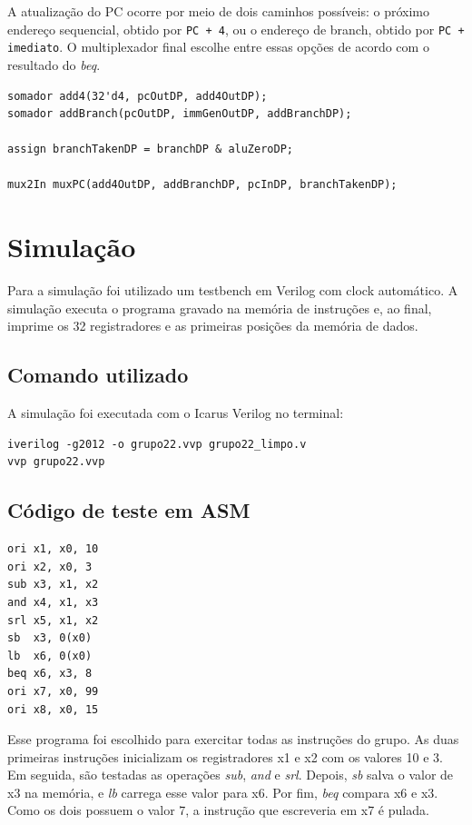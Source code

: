 \documentclass[12pt,a4paper]{article}
\begin{document}
A atualização do PC ocorre por meio de dois caminhos possíveis: o próximo endereço sequencial, obtido por \texttt{PC + 4}, ou o endereço de branch, obtido por \texttt{PC + imediato}. O multiplexador final escolhe entre essas opções de acordo com o resultado do \textit{beq}.

\begin{lstlisting}[style=verilogstyle,caption={Atualização do PC e decisão de branch.}]
somador add4(32'd4, pcOutDP, add4OutDP);
somador addBranch(pcOutDP, immGenOutDP, addBranchDP);

assign branchTakenDP = branchDP & aluZeroDP;

mux2In muxPC(add4OutDP, addBranchDP, pcInDP, branchTakenDP);
\end{lstlisting}

\section{Simulação}

Para a simulação foi utilizado um testbench em Verilog com clock automático. A simulação executa o programa gravado na memória de instruções e, ao final, imprime os 32 registradores e as primeiras posições da memória de dados.

\subsection{Comando utilizado}

A simulação foi executada com o Icarus Verilog no terminal:

\begin{lstlisting}[style=textstyle,caption={Comando utilizado para compilar e executar a simulação.}]
iverilog -g2012 -o grupo22.vvp grupo22_limpo.v
vvp grupo22.vvp
\end{lstlisting}

\subsection{Código de teste em ASM}

\begin{lstlisting}[style=textstyle,caption={Programa de teste em Assembly.}]
ori x1, x0, 10
ori x2, x0, 3
sub x3, x1, x2
and x4, x1, x3
srl x5, x1, x2
sb  x3, 0(x0)
lb  x6, 0(x0)
beq x6, x3, 8
ori x7, x0, 99
ori x8, x0, 15
\end{lstlisting}

Esse programa foi escolhido para exercitar todas as instruções do grupo. As duas primeiras instruções inicializam os registradores x1 e x2 com os valores 10 e 3. Em seguida, são testadas as operações \textit{sub}, \textit{and} e \textit{srl}. Depois, \textit{sb} salva o valor de x3 na memória, e \textit{lb} carrega esse valor para x6. Por fim, \textit{beq} compara x6 e x3. Como os dois possuem o valor 7, a instrução que escreveria em x7 é pulada.
\end{document}
